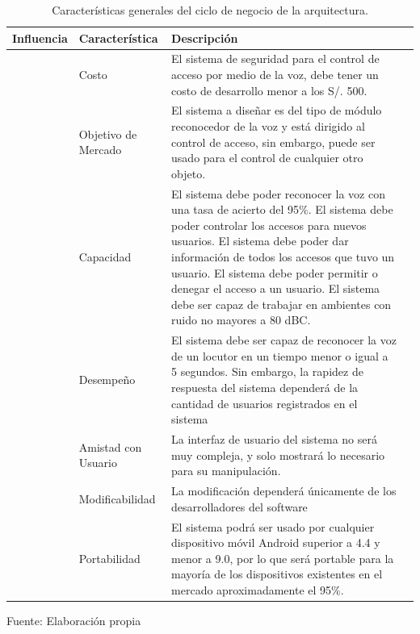 \begin{center}
\begin{table}[H]
\centering
\caption{\small{Características generales del ciclo de negocio de la arquitectura.}}
\label{table:tabla3.1}
\vskip 0.2cm
\begin{tabular}{|p{3cm}|p{4cm}|p{6cm}|p{3cm}|}
\hline
{\small Influencia} & {\small Característica} & {\small Descripción}  \\ 
\hline 
{\small \multirow{3}{4em}{Negocios}} & {\small Costo} & {\small El sistema de seguridad para el control de acceso por medio de la voz, debe tener un costo de desarrollo menor a los S/. 500.}  \\ 
\cline{2-3}
 & {\small Objetivo de Mercado} & {\small El sistema a diseñar es del tipo de módulo reconocedor de la voz y está dirigido al control de acceso, sin embargo, puede ser usado para el control de cualquier otro objeto.}  \\ 
\cline{2-3}
 & {\small Capacidad} & {\small El sistema debe poder reconocer la voz con una tasa de acierto del 95\%. El sistema debe poder controlar los accesos para nuevos usuarios. El sistema debe poder dar información de todos los accesos que tuvo un usuario. El sistema debe poder permitir o denegar el acceso a un usuario. El sistema debe ser capaz de trabajar en ambientes con ruido no mayores a 80 dBC.
} \\
\hline 
{\small \multirow{4}{4em}{Técnicos}} & {\small Desempeño} & {\small El sistema debe ser capaz de reconocer la voz de un locutor en un tiempo menor o igual a 5 segundos. Sin embargo, la rapidez de respuesta del sistema dependerá de la cantidad de usuarios registrados en el sistema}  \\ 
\cline{2-3}
 & {\small Amistad con Usuario} & {\small La interfaz de usuario del sistema no será muy compleja, y solo mostrará lo necesario para su manipulación.}  \\ 
\cline{2-3}
 & {\small Modificabilidad} & {\small La modificación dependerá únicamente de los desarrolladores del software}  \\ 
\cline{2-3}
 & {\small Portabilidad} & {\small El sistema podrá ser usado por cualquier dispositivo móvil Android superior a 4.4
y menor a 9.0, por lo que será portable para la mayoría de los dispositivos existentes en el mercado aproximadamente el 95\%.}  \\ 
\hline 
\end{tabular} 
\begin{center}
\vskip 0.2cm
{\small{Fuente: Elaboración propia}}
\end{center}
\end{table}
\end{center}

